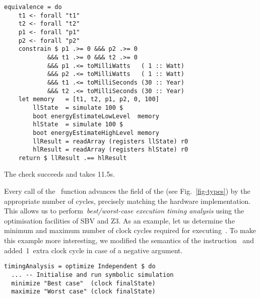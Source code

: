 \vspace{1mm}
\begin{verbatim}
equivalence = do
    t1 <- forall "t1"
    t2 <- forall "t2"
    p1 <- forall "p1"
    p2 <- forall "p2"
    constrain $ p1 .>= 0 &&& p2 .>= 0
            &&& t1 .>= 0 &&& t2 .>= 0
            &&& p1 .<= toMilliWatts   ( 1 :: Watt)
            &&& p2 .<= toMilliWatts   ( 1 :: Watt)
            &&& t1 .<= toMilliSeconds (30 :: Year)
            &&& t2 .<= toMilliSeconds (30 :: Year)
    let memory   = [t1, t2, p1, p2, 0, 100]
        llState  = simulate 100 $
        boot energyEstimateLowLevel  memory
        hlState  = simulate 100 $
        boot energyEstimateHighLevel memory
        llResult = readArray (registers llState) r0
        hlResult = readArray (registers hlState) r0
    return $ llResult .== hlResult
\end{verbatim}
\vspace{1mm}

\noindent
The  check succeeds and takes 11.5s.

Every call of the~ function advances the  field
of the  (see Fig.~\ref{fig-types}) by the appropriate number of
cycles, precisely matching the hardware implementation. This allows us to
perform~\emph{best/worst-case execution timing analysis} using the
optimisation facilities of SBV and Z3. As an example,
let us determine the minimum and maximum number of clock cycles required for
executing~. To make this example more
interesting, we modified the semantics of the instruction~ and
added~1~extra clock cycle in case of a negative argument.


\vspace{1mm}
\begin{verbatim}
timingAnalysis = optimize Independent $ do
  ... -- Initialise and run symbolic simulation
  minimize "Best case"  (clock finalState)
  maximize "Worst case" (clock finalState)
\end{verbatim}
\vspace{1mm}

